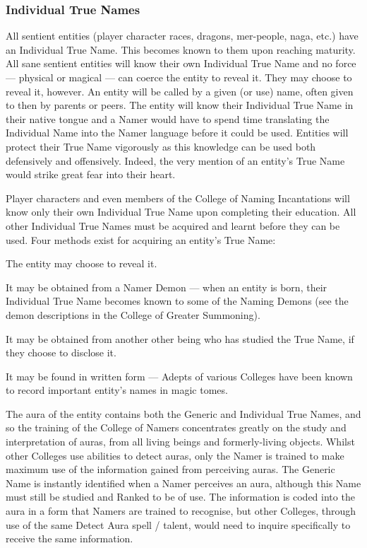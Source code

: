 \begin{multicols*}{3}
\subsubsection{Individual True Names}


All sentient entities (player character races, dragons, mer-people,
naga, etc.) have an Individual True Name. This becomes known to them
upon reaching maturity. All sane sentient entities will know their own
Individual True Name and no force --- physical or magical --- can coerce
the entity to reveal it. They may choose to reveal it, however.  An
entity will be called by a given (or use) name, often given to then by
parents or peers. The entity will know their Individual True Name in
their native tongue and a Namer would have to spend time translating
the Individual Name into the Namer language before it could be used.
Entities will protect their True Name vigorously as this knowledge can
be used both defensively and offensively.  Indeed, the very mention of
an entity's True Name would strike great fear into their heart.

Player characters and even members of the College of Naming
Incantations will know only their own Individual True Name upon
completing their education. All other Individual True Names must be
acquired and learnt before they can be used.  Four methods exist for
acquiring an entity's True Name:

\begin{Itemize}
\item The entity may choose to reveal it.

\item It may be obtained from a Namer Demon --- when an entity is born,
their Individual True Name becomes known to some of the Naming Demons
(see the demon descriptions in the College of Greater Summoning).

\item It may be obtained from another other being who has studied the
True Name, if they choose to disclose it.

\item It may be found in written form --- Adepts of various Colleges
have been known to record important entity's names in magic tomes.
\end{Itemize}

The aura of the entity contains both the Generic and Individual True
Names, and so the training of the College of Namers concentrates
greatly on the study and interpretation of auras, from all living
beings and formerly-living objects. Whilst other Colleges use
abilities to detect auras, only the Namer is trained to make maximum
use of the information gained from perceiving auras. The Generic Name
is instantly identified when a Namer perceives an aura, although this
Name must still be studied and Ranked to be of use. The information is
coded into the aura in a form that Namers are trained to recognise,
but other Colleges, through use of the same Detect Aura spell /
talent, would need to inquire specifically to receive the same
information.


\end{multicols*}
